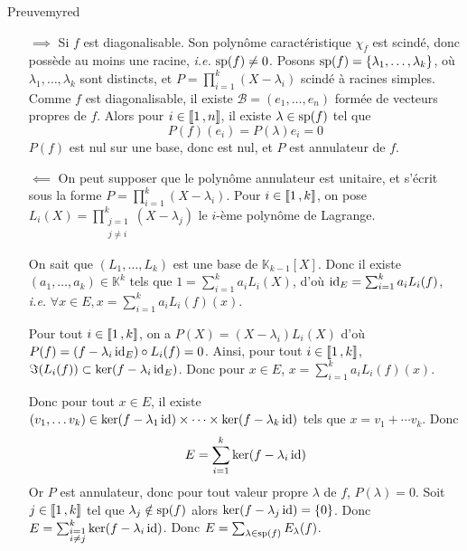     \begin{demo}{Preuve}{myred}
        \begin{itemize}
            \item[$\implies$] Si $f$ est diagonalisable. Son polynôme caractéristique $\chi_f$ est scindé, donc possède au moins une racine, \textit{i.e.} $\sp(f) \neq 0$. Posons $\sp(f) = \left\{\lambda_1,\ldots,\lambda_k\right\}$, où $\lambda_1,\ldots,\lambda_k$ sont distincts, et $P = \prod_{i=1}^k (X-\lambda_i)$ scindé à racines simples. Comme $f$ est diagonalisable, il existe $\mathcal{B} = (e_1,\ldots, e_n)$ formée de vecteurs propres de $f$. Alors pour $i \in \intervalleEntier{1}{n}$, il existe $\lambda \in \sp(f)$ tel que 
            \[ P(f)(e_i) = P(\lambda)e_i = 0 \]
            $P(f)$ est nul sur une base, donc est nul, et $P$ est annulateur de $f$.
            \item[$\impliedby$] On peut supposer que le polynôme annulateur est unitaire, et s’écrit sous la forme $P = \prod_{i=1}^{k}(X - \lambda_i)$. Pour $i \in \intervalleEntier{1}{k}$, on pose $L_i(X) = \prod_{\substack{j = 1 \\ j \neq i}}^{k} (X - \lambda_j)$ le $i$-ème polynôme de Lagrange. 
            
            On sait que $(L_1,\ldots,L_k)$ est une base de $\mathbb{K}_{k-1}[X]$. Donc il existe $(a_1,\ldots,a_k) \in \mathbb{K}^k$ tels que $1 = \sum_{i=1}^{k} a_i L_i(X)$, d’où $\id_E = \sum_{i=1}^{k} a_i L_i(f)$, \textit{i.e.} $\forall x \in E, x = \sum_{i=1}^{k} a_i L_i(f)(x)$.

            Pour tout $i \in \intervalleEntier{1}{k}$, on a $P(X) = (X - \lambda_i) L_i(X)$ d’où $P(f) = \left(f - \lambda_i \id_E\right) \circ L_i(f) = 0$. Ainsi, pour tout $i \in \intervalleEntier{1}{k}$, $\Im(L_i(f)) \subset \ker(f - \lambda_i \id_E)$. Donc pour $x \in E$, $x = \sum_{i=1}^{k} a_i L_i(f)(x)$. 

            Donc pour tout $x \in E$, il existe $(v_1, \ldots v_k) \in \ker(f - \lambda_1 \id) \times \cdots \times \ker(f - \lambda_k \id)$ tels que $x = v_1 + \cdots v_k$. Donc 
            \[ E = \sum_{i=1}^{k} \ker(f - \lambda_i \id) \]
            Or $P$ est annulateur, donc pour tout valeur propre $\lambda$ de $f$, $P(\lambda) = 0$. Soit $j \in \intervalleEntier{1}{k}$ tel que $\lambda_j \notin \sp(f)$ alors $\ker(f - \lambda_j \id) = \left\{0\right\}$. Donc $E = \sum_{\substack{i = 1 \\ i \neq j}}^{k} \ker(f - \lambda_i \id)$. Donc $E = \sum_{\lambda \in \sp(f)} E_{\lambda}(f)$.
        \end{itemize}
    \end{demo}


